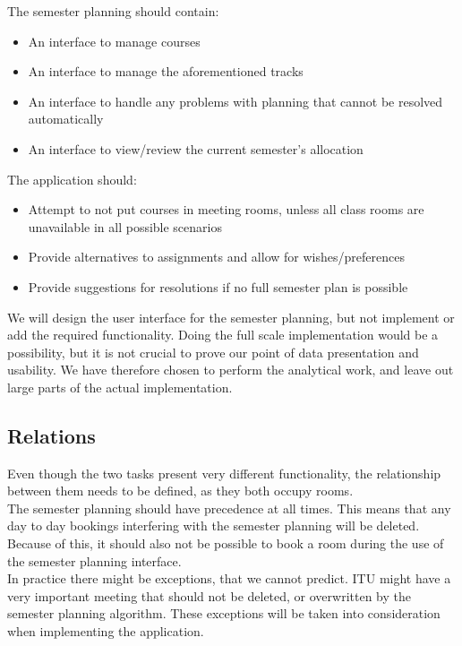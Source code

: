 The semester planning should contain:

\begin{itemize}
	\item An interface to manage courses
	\item An interface to manage the aforementioned tracks
	\item An interface to handle any problems with planning that cannot be resolved automatically
	\item An interface to view/review the current semester's allocation
\end{itemize}

The application should:

\begin{itemize}
	\item Attempt to not put courses in meeting rooms, unless all class rooms are unavailable in all possible scenarios
	\item Provide alternatives to assignments and allow for wishes/preferences
	\item Provide suggestions for resolutions if no full semester plan is possible
\end{itemize}


We will design the user interface for the semester planning, but not implement or add the required functionality. Doing the full scale implementation would be a possibility, but it is not crucial to prove our point of data presentation and usability. We have therefore chosen to perform the analytical work, and leave out large parts of the actual implementation.

\subsection{Relations}
\label{subsec:relations}
Even though the two tasks present very different functionality, the relationship between them needs to be defined, as they both occupy rooms. \\

The semester planning should have precedence at all times. This means that any day to day bookings interfering with the semester planning will be deleted. Because of this, it should also not be possible to book a room during the use of the semester planning interface. \\

In practice there might be exceptions, that we cannot predict. ITU might have a very important meeting that should not be deleted, or overwritten by the semester planning algorithm. These exceptions will be taken into consideration when implementing the application.

